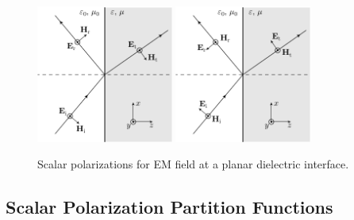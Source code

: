 \begin{figure}
  \centering
  \includegraphics[width=0.4\textwidth]{fig/analytical/kvectorTE}
  \includegraphics[width=0.4\textwidth]{fig/analytical/kvectorTM}
  \caption[Scalar polarizations at planar interface]{Scalar polarizations for EM field at a planar 
    dielectric interface.}
  \label{fig:planar}
\end{figure}





\subsection{Scalar Polarization Partition Functions}

